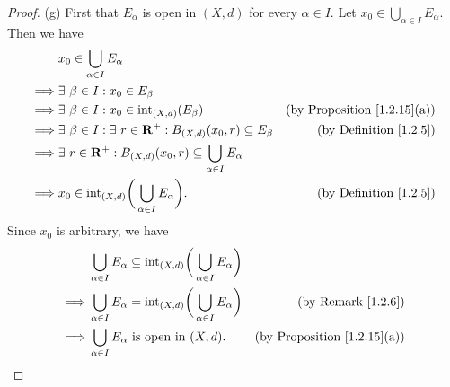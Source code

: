 \begin{proof}{(g)}
    First that \(E_\alpha\) is open in \((X, d)\) for every \(\alpha \in I\).
    Let \(x_0 \in \bigcup_{\alpha \in I} E_\alpha\).
    Then we have
    \begin{align*}
                 & x_0 \in \bigcup_{\alpha \in I} E_\alpha                                                                                              \\
        \implies & \exists\ \beta \in I : x_0 \in E_\beta                                                                                               \\
        \implies & \exists\ \beta \in I : x_0 \in \text{int}_{(X, d)}(E_\beta)                                & \text{(by Proposition \ref{1.2.15}(a))} \\
        \implies & \exists\ \beta \in I : \exists\ r \in \mathbf{R}^+ : B_{(X, d)}(x_0, r) \subseteq E_\beta  & \text{(by Definition \ref{1.2.5})}      \\
        \implies & \exists\ r \in \mathbf{R}^+ : B_{(X, d)}(x_0, r) \subseteq \bigcup_{\alpha \in I} E_\alpha                                           \\
        \implies & x_0 \in \text{int}_{(X, d)}\bigg(\bigcup_{\alpha \in I} E_\alpha\bigg).                    & \text{(by Definition \ref{1.2.5})}
    \end{align*}
    Since \(x_0\) is arbitrary, we have
    \begin{align*}
                 & \bigcup_{\alpha \in I} E_\alpha \subseteq \text{int}_{(X, d)}\bigg(\bigcup_{\alpha \in I} E_\alpha\bigg)                                           \\
        \implies & \bigcup_{\alpha \in I} E_\alpha = \text{int}_{(X, d)}\bigg(\bigcup_{\alpha \in I} E_\alpha\bigg)         & \text{(by Remark \ref{1.2.6})}          \\
        \implies & \bigcup_{\alpha \in I} E_\alpha \text{ is open in } (X, d).                                              & \text{(by Proposition \ref{1.2.15}(a))}
    \end{align*}


\end{proof}
